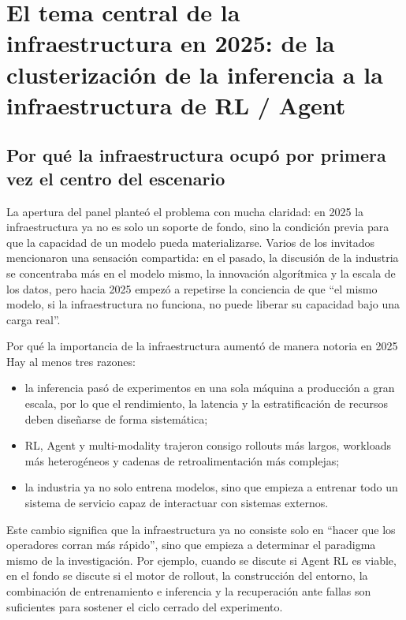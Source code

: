 \section{El tema central de la infraestructura en 2025: de la clusterización de la inferencia a la infraestructura de RL / Agent}

\subsection{Por qué la infraestructura ocupó por primera vez el centro del escenario}
La apertura del panel planteó el problema con mucha claridad: en 2025 la infraestructura ya no es solo un soporte de fondo, sino la condición previa para que la capacidad de un modelo pueda materializarse. Varios de los invitados mencionaron una sensación compartida: en el pasado, la discusión de la industria se concentraba más en el modelo mismo, la innovación algorítmica y la escala de los datos, pero hacia 2025 empezó a repetirse la conciencia de que ``el mismo modelo, si la infraestructura no funciona, no puede liberar su capacidad bajo una carga real''.

\begin{importantbox}{Por qué la importancia de la infraestructura aumentó de manera notoria en 2025}
Hay al menos tres razones:
\begin{itemize}
  \item la inferencia pasó de experimentos en una sola máquina a producción a gran escala, por lo que el rendimiento, la latencia y la estratificación de recursos deben diseñarse de forma sistemática;
  \item RL, Agent y multi-modality trajeron consigo rollouts más largos, workloads más heterogéneos y cadenas de retroalimentación más complejas;
  \item la industria ya no solo entrena modelos, sino que empieza a entrenar todo un sistema de servicio capaz de interactuar con sistemas externos.
\end{itemize}
\end{importantbox}

Este cambio significa que la infraestructura ya no consiste solo en ``hacer que los operadores corran más rápido'', sino que empieza a determinar el paradigma mismo de la investigación. Por ejemplo, cuando se discute si Agent RL es viable, en el fondo se discute si el motor de rollout, la construcción del entorno, la combinación de entrenamiento e inferencia y la recuperación ante fallas son suficientes para sostener el ciclo cerrado del experimento.

